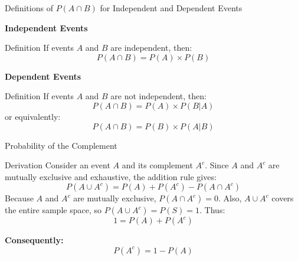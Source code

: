 \documentclass[handout]{beamer} %
\begin{document}
\begin{frame}{Definitions of \(P(A \cap B)\) for Independent and Dependent Events}

    \begin{minipage}[t]{0.45\textwidth}
        \centering
        \textbf{Independent Events}\pause
        \begin{block}{Definition}
            If events \(A\) and \(B\) are independent, then:\pause
            \[
            P(A \cap B) = P(A) \times P(B)
            \]\pause
        \end{block}
    \end{minipage}
    \hfill
    \begin{minipage}[t]{0.45\textwidth}
        \centering
        \textbf{Dependent Events}\pause
        \begin{block}{Definition}
            If events \(A\) and \(B\) are not independent, then:\pause
            \[
            P(A \cap B) = P(A) \times P(B|A)
            \]\pause
            or equivalently:
            \[
            P(A \cap B) = P(B) \times P(A|B)
            \]
        \end{block}
    \end{minipage}

\end{frame}

\begin{frame}{Probability of the Complement}

    \begin{block}{Derivation}
        Consider an event \(A\) and its complement \(A^c\). Since \(A\) and \(A^c\) are mutually exclusive and exhaustive, the addition rule gives:\pause
        \[
        P(A \cup A^c) = P(A) + P(A^c) - P(A \cap A^c)
        \]\pause
        Because \(A\) and \(A^c\) are mutually exclusive, \(P(A \cap A^c) = 0\). \pause Also, \(A \cup A^c\) covers the entire sample space, so \(P(A \cup A^c) = P(S) = 1\). \pause Thus:
        \[
        1 = P(A) + P(A^c)
        \] \pause
    \end{block}
    \pause
    \textbf{Consequently:}
    \[
    P(A^c) = 1 - P(A)
    \]
\end{frame}
\end{document}

